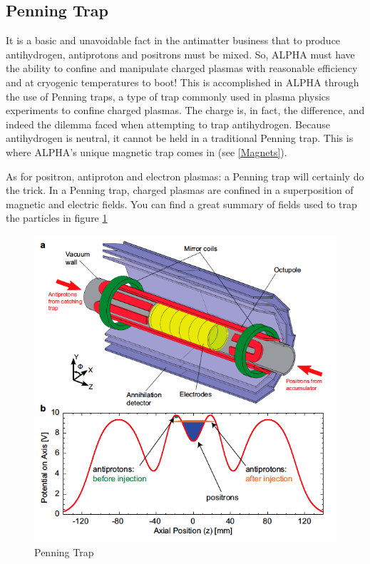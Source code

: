 \documentclass{article}
\begin{document}
\subsection{Penning Trap}
It is a basic and unavoidable fact in the antimatter business that to produce antihydrogen, antiprotons and positrons must be mixed. So, ALPHA must have the ability to confine and manipulate charged plasmas with reasonable efficiency and at cryogenic temperatures to boot!
This is accomplished in ALPHA through the use of Penning traps, a type of trap commonly used in plasma physics experiments to confine charged plasmas. The charge is, in fact, the difference, and indeed the dilemma faced when attempting to trap antihydrogen. Because antihydrogen is neutral, it cannot be held in a traditional Penning trap. This is where ALPHA’s unique magnetic trap comes in (see \ref{Magnets}).

As for positron, antiproton and electron plasmas: a Penning trap will certainly do the trick. In a Penning trap, charged plasmas are confined in a superposition of magnetic and electric fields. You can find a great summary of fields used to trap the particles in figure \ref{trap}

\begin{figure}[h]
\centering
\includegraphics[scale=0.4]{penning-trap-figure}
\caption{Penning Trap}
\label{trap}
\end{figure}
\end{document}
